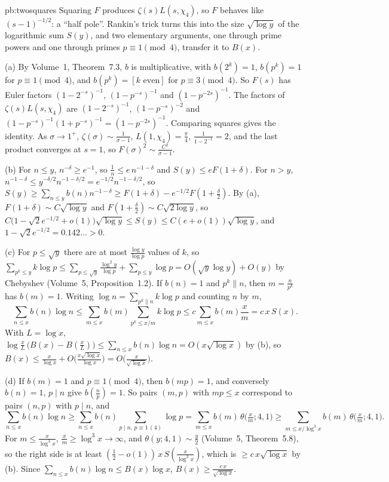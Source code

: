 \begin{solution}{pb:twosquares}
\idea Squaring $F$ produces $\zeta(s)L(s,\chi_4)$, so $F$ behaves like $(s-1)^{-1/2}$: a ``half pole''. Rankin's trick turns this into the size $\sqrt{\log y}$ of the logarithmic
sum $S(y)$, and two elementary arguments, one through prime powers and one through primes $p\equiv1\pmod4$, transfer it to $B(x)$.

\writeup (a) By Volume~1, Theorem~7.3, $b$ is multiplicative, with $b(2^k)=1$, $b(p^k)=1$ for $p\equiv1\pmod4$, and $b(p^k)=[k\text{ even}]$ for $p\equiv3\pmod4$. So $F(s)$ has Euler
factors $(1-2^{-s})^{-1}$, $(1-p^{-s})^{-1}$ and $(1-p^{-2s})^{-1}$. The factors of $\zeta(s)L(s,\chi_4)$ are $(1-2^{-s})^{-1}$, $(1-p^{-s})^{-2}$ and $(1-p^{-s})^{-1}(1+p^{-s})^{-1}=(1-p^{-2s})^{-1}$.
Comparing squares gives the identity. As $\sigma\to1^+$, $\zeta(\sigma)\sim\frac1{\sigma-1}$, $L(1,\chi_4)=\frac\pi4$, $\frac1{1-2^{-1}}=2$, and the last product converges at $s=1$, so
$F(\sigma)^2\sim\frac{C^2}{\sigma-1}$.

(b) For $n\le y$, $n^{-\delta}\ge e^{-1}$, so $\frac1n\le e\,n^{-1-\delta}$ and $S(y)\le eF(1+\delta)$. For $n>y$, $n^{-1-\delta}\le y^{-\delta/2}n^{-1-\delta/2}=e^{-1/2}n^{-1-\delta/2}$, so
$S(y)\ge\sum_{n\le y}b(n)n^{-1-\delta}\ge F(1+\delta)-e^{-1/2}F(1+\frac\delta2)$. By (a), $F(1+\delta)\sim C\sqrt{\log y}$ and $F(1+\frac\delta2)\sim C\sqrt{2\log y}$, so
$C\bigl(1-\sqrt2e^{-1/2}+o(1)\bigr)\sqrt{\log y}\le S(y)\le C(e+o(1))\sqrt{\log y}$, and $1-\sqrt2e^{-1/2}=0.142\ldots>0$.

(c) For $p\le\sqrt y$ there are at most $\frac{\log y}{\log p}$ values of $k$, so $\sum_{p^k\le y}k\log p\le\sum_{p\le\sqrt y}\frac{\log^2y}{\log p}+\sum_{p\le y}\log p=O(\sqrt y\log y)+O(y)$
by Chebyshev (Volume~5, Proposition~1.2). If $b(n)=1$ and $p^k\parallel n$, then $m=\frac n{p^k}$ has $b(m)=1$. Writing $\log n=\sum_{p^k\parallel n}k\log p$ and counting $n$ by $m$,
\[
\sum_{n\le x}b(n)\log n\le\sum_{m\le x}b(m)\sum_{p^k\le x/m}k\log p\le c\sum_{m\le x}b(m)\frac xm=c\,x\,S(x).
\]
With $L=\log x$, $\log\frac xL\,\bigl(B(x)-B(\frac xL)\bigr)\le\sum_{n\le x}b(n)\log n=O(x\sqrt{\log x})$ by (b), so $B(x)\le\frac x{\log x}+O\bigl(\frac{x\sqrt{\log x}}{\log x}\bigr)=O\bigl(\frac x{\sqrt{\log x}}\bigr)$.

(d) If $b(m)=1$ and $p\equiv1\pmod4$, then $b(mp)=1$, and conversely $b(n)=1$, $p\mid n$ give $b(\frac np)=1$. So pairs $(m,p)$ with $mp\le x$ correspond to pairs $(n,p)$ with $p\mid n$, and
\[
\sum_{n\le x}b(n)\log n\ge\sum_{n\le x}b(n)\sum_{p\mid n,\,p\equiv1\,(4)}\log p=\sum_{m\le x}b(m)\,\theta\bigl(\tfrac xm;4,1\bigr)\ge\sum_{m\le x/\log^3x}b(m)\,\theta\bigl(\tfrac xm;4,1\bigr).
\]
For $m\le\frac x{\log^3x}$, $\frac xm\ge\log^3x\to\infty$, and $\theta(y;4,1)\sim\frac y2$ (Volume~5, Theorem~5.8), so the right side is at least $(\frac12-o(1))\,x\,S(\frac x{\log^3x})$, which
is $\ge c\,x\sqrt{\log x}$ by (b). Since $\sum_{n\le x}b(n)\log n\le B(x)\log x$, $B(x)\ge\frac{c\,x}{\sqrt{\log x}}$.


\end{solution}
